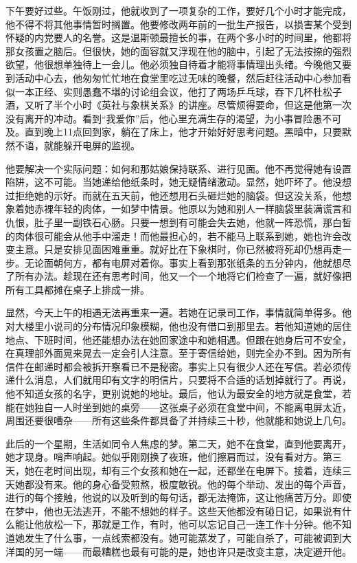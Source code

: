下午要好过些。午饭刚过，他就收到了一项复杂的工作，要好几个小时才能完成，他不得不将其他事情暂时搁置。他要修改两年前的一批生产报告，以损害某个受到怀疑的内党要人的名誉。这是温斯顿最擅长的事，在两个多小时的时间里，他都将那女孩置之脑后。但很快，她的面容就又浮现在他的脑中，引起了无法按捺的强烈欲望，他很想单独待上一会儿。他必须独自待着才能将事情理出头绪。今晚他又要到活动中心去，他匆匆忙忙地在食堂里吃过无味的晚餐，然后赶往活动中心参加看似一本正经、实则愚蠢不堪的讨论组会议，他打了两场乒乓球，吞下几杯杜松子酒，又听了半个小时《英社与象棋关系》的讲座。尽管烦得要命，但这是他第一次没有离开的冲动。看到``我爱你''后，他心里充满生存的渴望，为小事冒险愚不可及。直到晚上11点回到家，躺在了床上，他才开始好好思考问题。黑暗中，只要默然不语，就能躲开电屏的监视。

他要解决一个实际问题：如何和那姑娘保持联系、进行见面。他不再觉得她有设置陷阱，这不可能。当她递给他纸条时，她无疑情绪激动。显然，她吓坏了。他没想过拒绝她的示好。而就在五天前，他还想用石头砸烂她的脑袋。但这没关系，他想象着她赤裸年轻的肉体，一如梦中情景。他原以为她和别人一样脑袋里装满谎言和仇恨，肚子里一副铁石心肠。只要一想到有可能会失去她，他就一阵恐慌，那白皙的肉体很可能会从他手中溜走！而他最担心的，若不能马上联系到她，她也许会改变主意。只是安排见面困难重重。就好比在下象棋时，你已然被将死却仍想再走一步。无论面朝何方，都有电屏对着你。事实上看到那张纸条的五分钟内，他就想尽了所有办法。趁现在还有思考时间，他又一个一个地将它们检查了一遍，就好像把所有工具都摊在桌子上排成一排。

显然，今天上午的相遇无法再重来一遍。若她在记录司工作，事情就简单得多。他对大楼里小说司的分布情况印象模糊，他也没有借口到那里去。若他知道她的居住地点、下班时间，他还能想办法在她回家途中和她相遇。但跟在她身后可不安全，在真理部外面晃来晃去一定会引人注意。至于寄信给她，则完全办不到。因为所有信件在邮递时都会被拆开察看已不是秘密。事实上只有很少人还在写信。若必须传递什么消息，人们就用印有文字的明信片，只要将不合适的话划掉就行了。再说，他不知道女孩的名字，更别说她的地址。最后，他认为最安全的地方就是食堂，若能在她独自一人时坐到她的桌旁------这张桌子必须在食堂中间，不能离电屏太近，周围还要很嘈杂------所有这些条件都具备了并持续三十秒，他就能和她说上几句。

此后的一个星期，生活如同令人焦虑的梦。第二天，她不在食堂，直到他要离开，她才现身。哨声响起。她似乎刚刚换了夜班，他们擦肩而过，没有看对方。第三天，她在老时间出现，却有三个女孩和她在一起，还都坐在电屏下。接着，连续三天她都没有来。他的身心备受煎熬，极度敏锐。他的每个举动、发出的每个声音，进行的每个接触，他说的以及听到的每句话，都无法掩饰，这让他痛苦万分。即使在梦中，他也无法逃开，不能不想她的样子。这些天他都没有碰日记，如果说有什么能让他放松一下，那就是工作，有时，他可以忘记自己一连工作十分钟。他不知道她发生了什么事，一点线索都没有。她可能蒸发了，可能自杀了，可能被调到大洋国的另一端------而最糟糕也最有可能的是，她也许只是改变主意，决定避开他。

